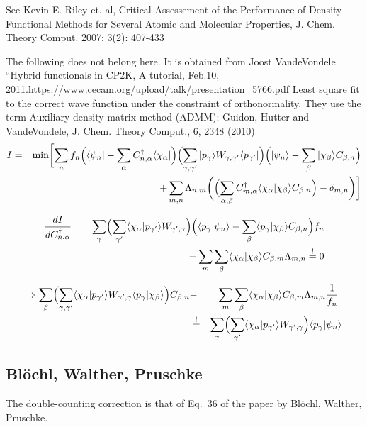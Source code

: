 \documentclass[11pt,a4paper]{report}
\begin{document}
See Kevin E. Riley et. al, Critical Assessement of the Performance of
Density Functional Methods for Several Atomic and Molecular
Properties, J. Chem. Theory Comput. 2007; 3(2): 407-433


The following does not belong here. It is obtained from Joost
VandeVondele ``Hybrid functionals in CP2K, A tutorial, Feb.10,
2011.\url{https://www.cecam.org/upload/talk/presentation_5766.pdf}
Least square fit to the correct wave function under the constraint of
orthonormality. They use the term Auxiliary density matrix method
(ADMM): Guidon, Hutter and VandeVondele, J. Chem. Theory Comput., 6,
2348 (2010)
\begin{eqnarray}
I&=&\min\biggl[
\sum_n f_n
\Bigl(\langle\psi_n|-\sum_\alpha C^\dagger_{n,\alpha}\langle\chi_\alpha|\Bigr)
\Bigl(\sum_{\gamma,\gamma'} |p_\gamma\rangle W_{\gamma,\gamma'}\langle p_{\gamma'}|\Bigr)
\Bigl(|\psi_n\rangle-\sum_\beta |\chi_\beta\rangle C_{\beta,n}\Bigr)
\nonumber\\
&&+\sum_{m,n}\Lambda_{n,m}\biggl(
\Bigl(\sum_{\alpha,\beta}
C^\dagger_{m,\alpha}\langle\chi_{\alpha}|\chi_\beta\rangle C_{\beta,n}
\Bigr)
-\delta_{m,n}\biggr)
\biggr]
\end{eqnarray}


\begin{eqnarray}
\frac{dI}{dC^\dagger_{n,\alpha}}&=&
\sum_\gamma
\Bigl(\sum_{\gamma'} \langle\chi_\alpha|p_{\gamma'}\rangle W_{\gamma',\gamma}\Bigr)
\Bigl(\langle p_{\gamma}|\psi_n\rangle-\sum_\beta \langle p_{\gamma}|\chi_\beta\rangle C_{\beta,n}\Bigr)f_n
\nonumber\\
&&+\sum_{m}
\sum_{\beta}
\langle\chi_{\alpha}|\chi_\beta\rangle C_{\beta,m}\Lambda_{m,n}\stackrel{!}{=}0
\end{eqnarray}

\begin{eqnarray}
\Rightarrow 
\sum_\beta
\Bigl(\sum_{\gamma,\gamma'}
\langle\chi_\alpha|p_{\gamma'}\rangle W_{\gamma',\gamma}
 \langle p_{\gamma}|\chi_\beta\rangle \Bigr)C_{\beta,n}
&-&\sum_{m}
\sum_{\beta}
\langle\chi_{\alpha}|\chi_\beta\rangle C_{\beta,m}\Lambda_{m,n}\frac{1}{f_n}\
\nonumber\\
&\stackrel{!}{=}&
\sum_\gamma
\Bigl(\sum_{\gamma'} \langle\chi_\alpha|p_{\gamma'}\rangle W_{\gamma',\gamma}\Bigr)
\langle p_{\gamma}|\psi_n\rangle
\end{eqnarray}





\subsection{Bl\"ochl, Walther, Pruschke}
The double-counting correction is that of Eq.~36 of the paper by
Bl\"ochl, Walther, Pruschke\cite{bloechl11_prb84_205101}.
\end{document}
